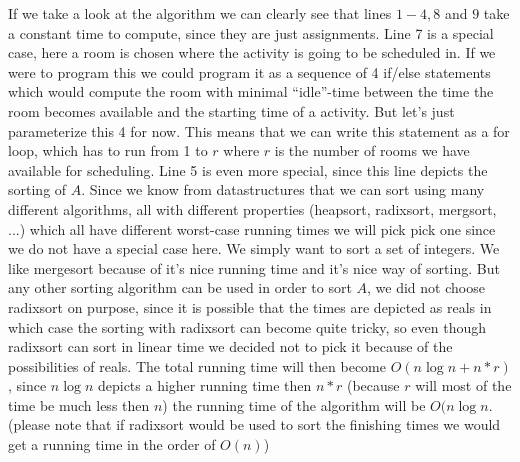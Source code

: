 \documentclass{article}
\begin{document}
\begin{itemize}
\begin{itemize}
 If we take a look at the algorithm we can clearly see that lines $1-4,8$ and $9$ take a constant time to compute, since they are just assignments. Line 7 is a special case, here a room is chosen where the activity is going to be scheduled in. If we were to program this we could program it as a sequence of 4 if/else statements which would compute the room with minimal ``idle''-time between the time the room becomes available and the starting time of a activity. But let's just parameterize this 4 for now. This means that we can write this statement as a for loop, which has to run from 1 to $r$ where $r$ is the number of rooms we have available for scheduling. Line 5 is even more special, since this line depicts the sorting of $A$. Since we know from datastructures that we can sort using many different algorithms, all with different properties (heapsort, radixsort, mergsort, ...) which all have different worst-case running times we will pick pick one since we do not have a special case here. We simply want to sort a set of integers. We like mergesort because of it's nice running time and it's nice way of sorting. But any other sorting algorithm can be used in order to sort $A$, we did not choose radixsort on purpose, since it is possible that the times are depicted as reals in which case the sorting with radixsort can become quite tricky, so even though radixsort can sort in linear time we decided not to pick it because of the possibilities of reals. The total running time will then become $O(n\log{n}+n*r)$, since $n\log{n}$ depicts a higher running time then $n*r$ (because $r$ will most of the time be much less then $n$) the running time of the algorithm will be $O(n\log{n}$. (please note that if radixsort would be used to sort the finishing times we would get a running time in the order of $O(n)$)


\end{itemize}
\end{itemize}
\end{document}
